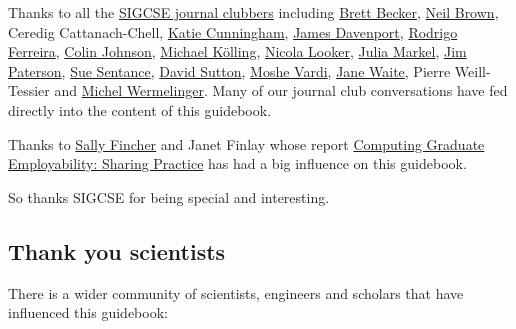 \documentclass[
]{book}
\begin{document}
Thanks to all the \href{https://sigcse.cs.manchester.ac.uk}{SIGCSE journal clubbers} including \href{https://www.brettbecker.com/}{Brett Becker}, \href{https://www.twistedsquare.com/}{Neil Brown}, Ceredig Cattanach-Chell, \href{https://www.kicunningham.com/}{Katie Cunningham}, \href{https://en.wikipedia.org/wiki/James_H._Davenport}{James Davenport}, \href{https://riceacademy.rice.edu/junior-fellows/dr-rodrigo-ferreira}{Rodrigo Ferreira}, \href{https://www.nottingham.ac.uk/computerscience/people/colin.johnson}{Colin Johnson}, \href{https://en.wikipedia.org/wiki/Michael_K\%C3\%B6lling}{Michael Kölling}, \href{https://www.gla.ac.uk/pgrs/nicolalooker/}{Nicola Looker}, \href{https://juliamarkel.github.io/}{Julia Markel}, \href{https://www.gcu.ac.uk/staff/jimpaterson}{Jim Paterson}, \href{https://en.wikipedia.org/wiki/Sue_Sentance}{Sue Sentance}, \href{https://www.brookes.ac.uk/templates/pages/staff.aspx?uid=p0073862}{David Sutton}, \href{https://en.wikipedia.org/wiki/Moshe_Vardi}{Moshe Vardi}, \href{http://eecs.qmul.ac.uk/profiles/waitejanelisa.html}{Jane Waite}, Pierre Weill-Tessier and \href{https://www.open.ac.uk/people/mw4687}{Michel Wermelinger}. Many of our journal club conversations have fed directly into the content of this guidebook.

Thanks to \href{https://en.wikipedia.org/wiki/Sally_Fincher}{Sally Fincher} and Janet Finlay whose report \href{https://kar.kent.ac.uk/53848}{Computing Graduate Employability: Sharing Practice} \citep{fincherreview} has had a big influence on this guidebook.

So thanks SIGCSE for being special and interesting. 🙏

\hypertarget{scientists}{%
\subsection{Thank you scientists}\label{scientists}}

There is a wider community of scientists, engineers and scholars that have influenced this guidebook:
\end{document}
